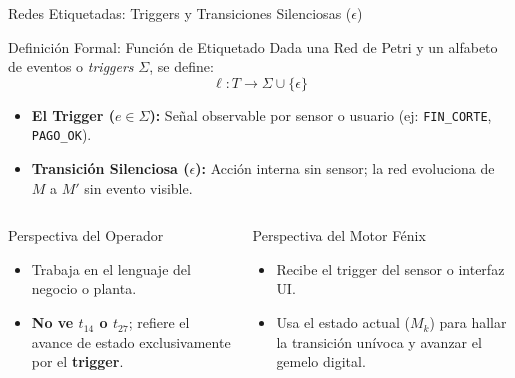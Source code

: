 \documentclass[10pt, aspectratio=169]{beamer}
\begin{document}
\begin{frame}{Redes Etiquetadas: Triggers y Transiciones Silenciosas ($\epsilon$)}
	\begin{block}{Definición Formal: Función de Etiquetado}
		Dada una Red de Petri y un alfabeto de eventos o \emph{triggers} $\Sigma$, se define:
		\[ \ell: T \longrightarrow \Sigma \cup \{\epsilon\} \]
		\vspace{-0.2cm}
		\begin{itemize}
			\item \textbf{El Trigger ($e \in \Sigma$):} Señal observable por sensor o usuario (ej: \texttt{FIN\_CORTE}, \texttt{PAGO\_OK}).
			\item \textbf{Transición Silenciosa ($\epsilon$):} Acción interna sin sensor; la red evoluciona de $M$ a $M'$ sin evento visible.
		\end{itemize}
	\end{block}

	\begin{columns}
		\begin{exampleblock}{Perspectiva del Operador}
			\small
			\begin{itemize}
				\item Trabaja en el lenguaje del negocio o planta.
				\item \textbf{No ve $t_{14}$ o $t_{27}$}; refiere el avance de estado exclusivamente por el \textbf{trigger}.
			\end{itemize}
		\end{exampleblock}

		\begin{alertblock}{Perspectiva del Motor Fénix}
			\small
			\begin{itemize}
				\item Recibe el trigger del sensor o interfaz UI.
				\item Usa el estado actual ($M_k$) para hallar la transición unívoca y avanzar el gemelo digital.
			\end{itemize}
		\end{alertblock}
	\end{columns}
\end{frame}
\end{document}
